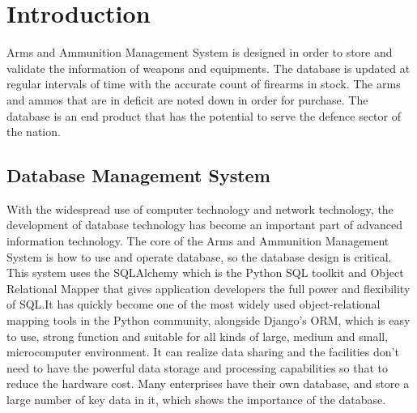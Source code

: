 \documentclass[12pt,a4paper]{report}
\begin{document}
\renewcommand{\contentsname}{Table of Contents}
\tableofcontents
{}
\listoffigures
{}
\newpage

\pagestyle{fancy}
\fancyhf{}
\renewcommand{\headrulewidth}{0.5pt}
\renewcommand{\footrulewidth}{0.5pt}

\chapter{Introduction}

Arms and Ammunition Management System is designed in order to store and validate the information of
weapons and equipments. The database is updated at regular intervals of time with the accurate
count of firearms in stock. The arms and ammos that are in deficit are noted down in order for
purchase. The database is an end product that has the potential to serve the defence sector of
the nation.

\section{Database Management System }

With the widespread use of computer technology and network technology, the development of database technology has become an important part of advanced information technology. The core of the Arms and Ammunition Management System is how to use and operate database, so the database design is critical. This system uses the SQLAlchemy which is the Python SQL toolkit and Object Relational Mapper that gives application developers the full power and flexibility of SQL.It has quickly become one of the most widely used object-relational mapping tools in the Python community, alongside Django's ORM, which is easy to use, strong function and suitable for all kinds of large, medium and small, microcomputer environment. It can realize data sharing and the facilities don't need to have the powerful data storage and processing capabilities so that to reduce the hardware cost. Many enterprises have their own database, and store a large number of key data in it, which shows the importance of the database.\\
\end{document}
